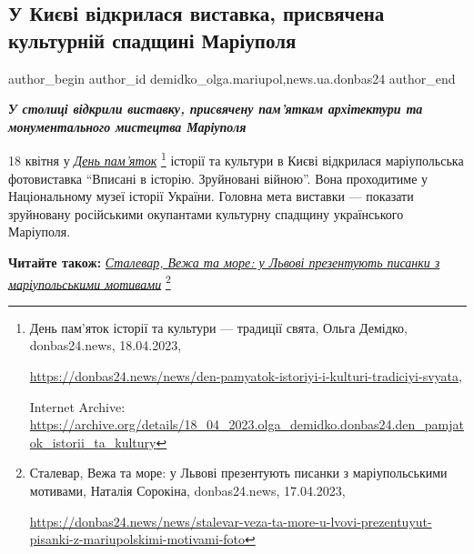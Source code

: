  
 
 
 
 
 
\subsection{У Києві відкрилася виставка, присвячена культурній спадщині Маріуполя}
\label{sec:19_04_2023.stz.news.ua.donbas24.1.kyiv_vystavka_kult_spadchyna_mrpl}
 
\ifcmt
 author_begin
   author_id demidko_olga.mariupol,news.ua.donbas24
 author_end
\fi

\begin{center}
  \em\color{blue}\bfseries\Large
У столиці відкрили виставку, присвячену пам'яткам архітектури та монументального мистецтва Маріуполя
\end{center}


18 квітня у \href{https://archive.org/details/18_04_2023.olga_demidko.donbas24.den_pamjatok_istorii_ta_kultury}{\emph{День пам'яток}}%
\footnote{День пам'яток історії та культури — традиції свята, Ольга Демідко, donbas24.news, 18.04.2023, \par%
\url{https://donbas24.news/news/den-pamyatok-istoriyi-i-kulturi-tradiciyi-svyata}, \par%
Internet Archive: \url{https://archive.org/details/18_04_2023.olga_demidko.donbas24.den_pamjatok_istorii_ta_kultury}%
} історії та культури в Києві відкрилася маріупольська
фотовиставка \enquote{Вписані в історію. Зруйновані війною}. Вона проходитиме у
Національному музеї історії України. Головна мета виставки — показати
зруйновану російськими окупантами культурну спадщину українського Маріуполя.

\textbf{Читайте також:} \href{https://donbas24.news/news/stalevar-veza-ta-more-u-lvovi-prezentuyut-pisanki-z-mariupolskimi-motivami-foto}{\emph{Сталевар, Вежа та море: у Львові презентують писанки з маріупольськими мотивами}}%
\footnote{Сталевар, Вежа та море: у Львові презентують писанки з маріупольськими мотивами, Наталія Сорокіна, donbas24.news, 17.04.2023, \par%
\url{https://donbas24.news/news/stalevar-veza-ta-more-u-lvovi-prezentuyut-pisanki-z-mariupolskimi-motivami-foto}%
}

